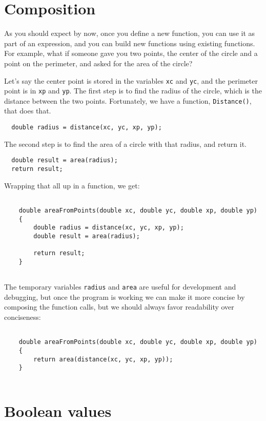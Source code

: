 \section{Composition}

As you should expect by now, once you define a new function,
you can use it as part of an expression, and you can build
new functions using existing functions.  For example, what if someone
gave you two points, the center of the circle and a point on
the perimeter, and asked for the area of the circle?

Let's say the center point is stored in the variables {\tt xc}
and {\tt yc}, and the perimeter point is in {\tt xp} and
{\tt yp}.  The first step is to find the radius of the circle, which
is the distance between the two points.  Fortunately, we have
a function, {\tt Distance()}, that does that.

\begin{verbatim}
  double radius = distance(xc, yc, xp, yp);
\end{verbatim}
%
The second step is to find the area of a circle with that
radius, and return it.

\begin{verbatim}
  double result = area(radius);
  return result;
\end{verbatim}
%
Wrapping that all up in a function, we get:

\begin{verbatim}

    double areaFromPoints(double xc, double yc, double xp, double yp) 
    {
        double radius = distance(xc, yc, xp, yp);
        double result = area(radius);
        
        return result;
    } 
    
\end{verbatim}
%


The temporary variables {\tt radius} and {\tt area} are
useful for development and debugging, but once the program is
working we can make it more concise by composing
the function calls, but we should always favor readability over conciseness:

\begin{verbatim}

    double areaFromPoints(double xc, double yc, double xp, double yp) 
    {
        return area(distance(xc, yc, xp, yp));
    }
     
\end{verbatim}


\section{Boolean values}

